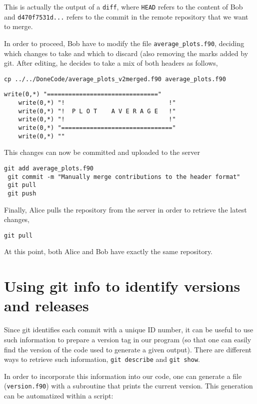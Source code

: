 \documentclass[a4paper,10pt]{article}
\begin{document}
This is actually the output of a \texttt{diff}, where \texttt{HEAD} refers to the content of Bob and \texttt{d470f7531d...} refers to the commit in the remote repository that we want to merge.

In order to proceed, Bob have to modify the file \texttt{average\_plots.f90}, deciding which changes to take and which to discard (also removing the marks added by git. After editing, he decides to take a mix of both headers as follows,

\begin{lstlisting}[style=AliceFake]
 cp ../../DoneCode/average_plots_v2merged.f90 average_plots.f90
\end{lstlisting}
\begin{lstlisting}[style=Text]
    write(0,*) "==============================="
    write(0,*) "!                             !"
    write(0,*) "!  P L O T    A V E R A G E   !"
    write(0,*) "!                             !"
    write(0,*) "==============================="
    write(0,*) ""
\end{lstlisting}

This changes can now be committed and uploaded to the server

\begin{lstlisting}[style=Bob]
 git add average_plots.f90
 git commit -m "Manually merge contributions to the header format"
 git pull
 git push
\end{lstlisting}

Finally, Alice pulls the repository from the server in order to retrieve the latest changes,

\begin{lstlisting}[style=Alice]
 git pull
\end{lstlisting}

At this point, both Alice and Bob have exactly the same repository.

\clearpage

\section{Using git info to identify versions and releases}
Since git identifies each commit with a unique ID number, it can be useful to use such information to prepare a version tag in our program (so that one can easily find the version of the code used to generate a given output). There are different ways to retrieve such information, \texttt{git describe} and \texttt{git show}.

In order to incorporate this information into our code, one can generate a file (\texttt{version.f90}) with a subroutine that prints the current version. This generation can be automatized within a script:
\end{document}
